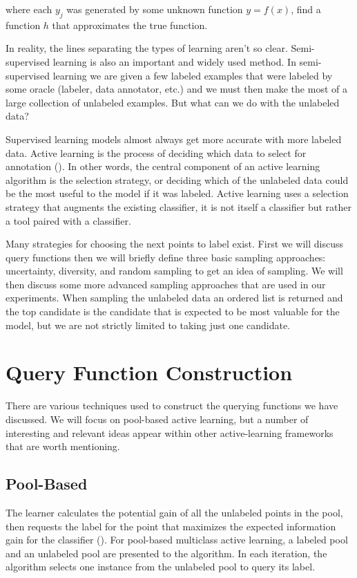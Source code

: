 where each $y_j$ was generated by some unknown function $y=f(x)$, find a function $h$ that approximates the true function.

In reality, the lines separating the types of learning aren't so clear. Semi-supervised learning is also an important and widely used method. In semi-supervised learning we are given a few labeled examples that were labeled by some oracle (labeler, data annotator, etc.) and we must then make the most of a large collection of unlabeled examples. But what can we do with the unlabeled data? 

Supervised learning models almost always get more accurate with more labeled data. Active learning is the process of deciding which data to select for annotation (\cite{munro2021human}). In other words, the central component of an active learning algorithm is the selection strategy, or deciding which of the unlabeled data could be the most useful to the model if it was labeled. Active learning uses a selection strategy that augments the existing classifier, it is not itself a classifier but rather a tool paired with a classifier.

Many strategies for choosing the next points to label exist. First we will discuss query functions then we will briefly define three basic sampling approaches: uncertainty, diversity, and random sampling to get an idea of sampling. We will then discuss some more advanced sampling approaches that are used in our experiments. When sampling the unlabeled data an ordered list is returned and the top candidate is the candidate that is expected to be most valuable for the model, but we are not strictly limited to taking just one candidate.

\section{Query Function Construction}
There are various techniques used to construct the querying functions we have discussed. We will focus on pool-based active learning, but a number of interesting and relevant ideas appear within other active-learning frameworks that are worth mentioning.

\subsection{Pool-Based}
The learner calculates the potential gain of all the unlabeled points in the pool, then requests the label for the point that maximizes the expected information gain for the classifier (\cite{huang2016alce}). For pool-based multiclass active learning, a labeled pool and an unlabeled pool are presented to the algorithm. In each iteration, the algorithm selects one instance from the unlabeled pool to query its label.

